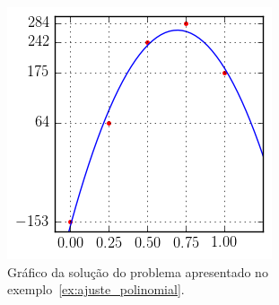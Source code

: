 \begin{figure}
  \centering
  \includegraphics{cap_ajuste/pics/ex_ajuste_polinomial/ex_ajuste_polinomial}
  \caption{Gráfico da solução do problema apresentado no exemplo~\ref{ex:ajuste_polinomial}.}
  \label{fig:ex_ajuste_polinomial}
\end{figure}


